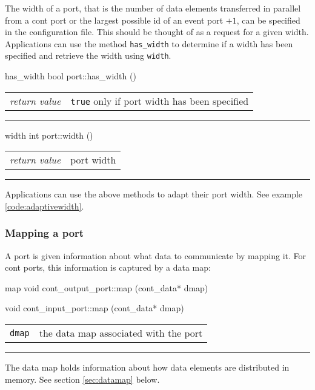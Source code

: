 \documentclass[a4paper]{report}
\makeatletter
\newenvironment{parameters}%
{\begin{tabular}{@{\hspace{2em}}lp{0.6\textwidth}}}%
{\end{tabular}\par\vspace{1mm}\par\hrule\par\vspace{5mm}}
\makeatother
\begin{document}
The width of a port, that is the number of data
elements transferred in parallel from a cont port or the largest
possible id of an event port $+ 1$, can be specified in the
configuration file. This should be thought of as a request for a given
width.  Applications can use the method \lstinline|has_width| to
determine if a width has been specified and retrieve the width using
\lstinline|width|.

\begin{head}{has_width}
  bool port::has_width ()
\end{head}
\begin{parameters}
  \emph{return value} & \lstinline|true| only if port width has been
                         specified \\
\end{parameters}

\begin{head}{width}
  int port::width ()
\end{head}
\begin{parameters}
  \emph{return value} & port width \\
\end{parameters}

Applications can use the above methods to adapt their port width.  See
example \ref{code:adaptivewidth}.

\subsubsection{Mapping a port}

A port is given information about what data to communicate by mapping
it.  For cont ports, this information is captured by a data map:

\begin{head}{map}
  void cont_output_port::map (cont_data* dmap)

  void cont_input_port::map (cont_data* dmap)
\end{head}
\begin{parameters}
  \lstinline|dmap| & the data map associated with the port \\
\end{parameters}

The data map holds information about how data elements are distributed
in memory.  See section \ref{sec:datamap} below.
\end{document}
